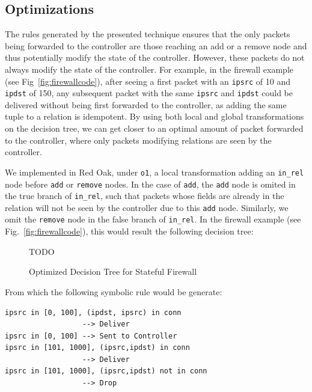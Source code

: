 \documentclass[preprint]{sigplanconf}
\begin{document}
\subsection*{Optimizations}
The rules generated by the presented technique ensures that the only packets being forwarded to the controller are those reaching an add or a remove node and thus potentially modify the state of the controller. However, these packets do not always modify the state of the controller. For example, in the firewall example (see Fig~\ref{fig:firewallcode}), after seeing a first packet with an \lstinline|ipsrc| of 10 and \lstinline|ipdst| of 150, any subsequent packet with the same \lstinline|ipsrc| and \lstinline|ipdst| could be delivered without being first forwarded to the controller, as adding the same tuple to a relation is idempotent. By using both local and global transformations on the decision tree, we can get closer to an optimal amount of packet forwarded to the controller, where only packets modifying relations are seen by the controller.

We implemented in Red Oak, under \lstinline|o1|, a local transformation adding an \lstinline|in_rel| node before \lstinline|add| or \lstinline|remove| nodes. In the case of \lstinline|add|, the \lstinline|add| node is omited in the true branch of \lstinline|in_rel|, such that packets whose fields are already in the relation will not be seen by the controller due to this \lstinline|add| node. Similarly, we omit the \lstinline|remove| node in the false branch of \lstinline|in_rel|. In the firewall example (see Fig.~\ref{fig:firewallcode}), this would result the following decision tree:

\begin{figure}[ht]
  TODO
\caption{Optimized Decision Tree for Stateful Firewall}     
\label{fig:decisiontreeopt}  
  \end{figure}


From which the following symbolic rule would be generate:
\begin{lstlisting}
ipsrc in [0, 100], (ipdst, ipsrc) in conn
                  --> Deliver
ipsrc in [0, 100] --> Sent to Controller
ipsrc in [101, 1000], (ipsrc,ipdst) in conn
                  --> Deliver
ipsrc in [101, 1000], (ipsrc,ipdst) not in conn
                  --> Drop
\end{lstlisting}
\end{document}
